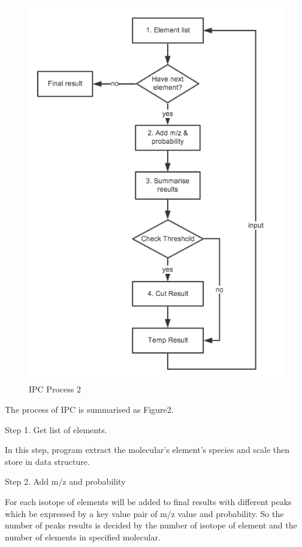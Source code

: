 \documentclass[letterpaper,twocolumn,10pt]{article}
\begin{document}
\begin{figure}[h!]
\centering
\includegraphics[scale=0.45]{ipc02}
\caption{IPC Process 2}
\label{threadsVsSync}
\end{figure}

The process of IPC is summarised as Figure2.

Step 1. Get list of elements.

In this step, program extract the molecular's element's species and scale then store in data structure. 

Step 2. Add m/z and probability

For each isotope of elements will be added to final results with different peaks which be expressed by a key value pair of m/z value and probability.  So the number of peaks results is decided by the number of isotope of element and the number of elements in specified molecular.
\end{document}
